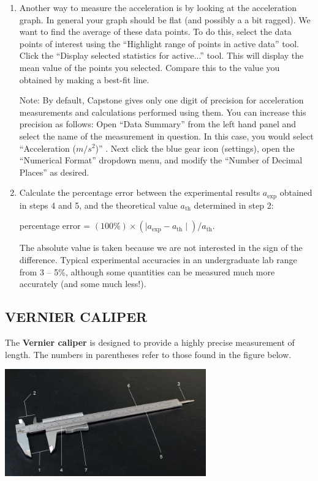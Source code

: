 \begin{enumerate}
\item Another way to measure the acceleration is by looking at the acceleration graph.  In general your graph should be flat (and possibly a a bit ragged).  We want to find the average of these data points.  To do this, select the data points of interest using the ``Highlight range of points in active data'' tool.  Click the ``Display selected statistics for active...'' tool.  This will display the mean value of the points you selected.  Compare this to the value you obtained by making a best-fit line.

Note:  By default, Capstone gives only one digit of precision for acceleration
measurements and calculations performed using them.  
You can increase this precision as follows:  
Open ``Data Summary'' from the left hand panel 
and select the name of the measurement in question.
In this case, you would select ``Acceleration ($m/s^2$)'' .
Next click the blue gear icon (settings), 
open the ``Numerical Format'' dropdown menu, 
and modify the ``Number of Decimal Places'' as desired.

\item Calculate the percentage error between the experimental results \(a_{\textrm{exp}}\) obtained in steps 4 and 5, and the theoretical value \(a_{\textrm{th}}\) determined in step 2:

percentage error = \( (100\%) \times \left(\mid a_{\textrm{exp}} - a_{\textrm{th}} \mid\right) / a_{\textrm{th}} . \)

The absolute value is taken because we are not interested in the sign of the difference.  Typical experimental accuracies in an undergraduate lab range from 3 -- 5\%, although some quantities can be measured much more accurately (and some much less!).

\end{enumerate}

\subsection*{VERNIER CALIPER}

The \textbf{Vernier caliper} is designed to provide a highly precise measurement of length.  The numbers in parentheses refer to those found in the figure below.
\begin{center} \includegraphics*[width=0.65\textwidth]{imgs/6labs/6Alab/6Aexp2/6A-EXP2-fig7_webtext.jpg} \end{center}

